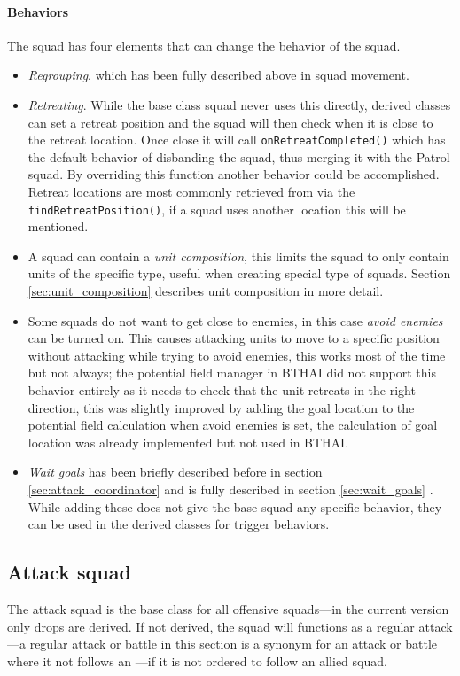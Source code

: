 \paragraph{Behaviors}
The squad has four elements that can change the behavior of the squad.
\begin{itemize}
	\item \emph{Regrouping}, which has been fully described above in squad movement.
	\item \emph{Retreating}. While the base class squad never uses this directly, derived classes can set a retreat position and the squad will then check when it is close to the retreat location. Once close it will call \texttt{onRetreatCompleted()} which has the default behavior of disbanding the squad, thus merging it with the Patrol squad. By overriding this function another behavior could be accomplished. Retreat locations are most commonly retrieved from  via the \texttt{findRetreatPosition()}, if a squad uses another location this will be mentioned.
	\item A squad can contain a \emph{unit composition}, this limits the squad to only contain units of the specific type, useful when creating special type of squads. Section \ref{sec:unit_composition} describes unit composition in more detail.
	\item Some squads do not want to get close to enemies, in this case \emph{avoid enemies} can be turned on. This causes attacking units to move to a specific position without attacking while trying to avoid enemies, this works most of the time but not always; the potential field manager in BTHAI did not support this behavior entirely as it needs to check that the unit retreats in the right direction, this was slightly improved by adding the goal location to the potential field calculation when avoid enemies is set, the calculation of goal location was already implemented but not used in BTHAI.
	\item \emph{Wait goals} has been briefly described before in section \ref{sec:attack_coordinator}  and is fully described in section \ref{sec:wait_goals} . While adding these does not give the base squad any specific behavior, they can be used in the derived classes for trigger behaviors.
\end{itemize}

\subsection{Attack squad}
\label{sec:attack_squad}
The attack squad is the base class for all offensive squads—in the current version only drops are derived. If not derived, the squad will functions as a regular attack—a regular attack or battle in this section is a synonym for an attack or battle where it not follows an —if it is not ordered to follow an allied squad.

